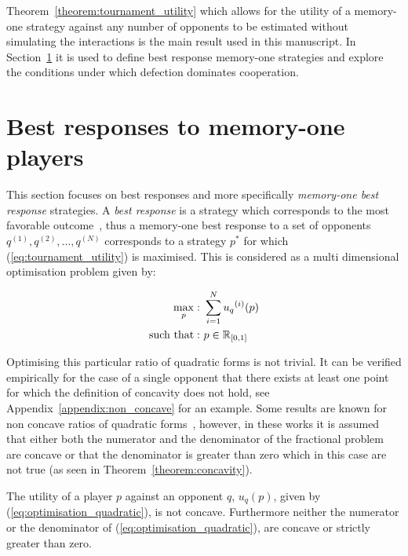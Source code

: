 Theorem~\ref{theorem:tournament_utility} which allows for the utility of a
memory-one strategy against any number of opponents to be estimated without
simulating the interactions is the main result used in this manuscript. In
Section~\ref{section:best_response_mem_one} it is used to  define best response
memory-one strategies and explore the conditions under which defection dominates
cooperation.

\section{Best responses to memory-one players}\label{section:best_response_mem_one}

This section focuses on best responses and more specifically \textit{memory-one
best response} strategies. A \textit{best response} is a strategy which
corresponds to the most favorable outcome~\cite{Tadelis2013}, thus a memory-one
best response to a set of opponents \(q^{(1)}, q^{(2)}, \dots, q^{(N)}\) corresponds to a strategy \(p^*\) for which
(\ref{eq:tournament_utility}) is maximised. This is considered as a multi
dimensional optimisation problem given by:

\begin{equation}\label{eq:mo_tournament_optimisation}
    \begin{aligned}
    \max_p: & \ \sum_{i=1} ^ {N} {u_q}^{(i)} (p)
    \\
    \text{such that}: & \ p \in \mathbb{R}_{[0, 1]}
    \end{aligned}
\end{equation}

Optimising this particular ratio of quadratic forms is not trivial. It can be
verified empirically for the case of a single opponent that there exists at least
one point for which the definition of concavity does not hold, see Appendix~\ref{appendix:non_concave}
for an example. Some results are
known for non concave ratios of quadratic forms~\cite{Beck2009, Hongyan2014},
however, in these works it is assumed that either both the numerator and the
denominator of the fractional problem are concave or that the denominator is
greater than zero which in this case are not true
(as seen in Theorem~\ref{theorem:concavity}).

\begin{theorem}\label{theorem:concavity}
    The utility of a player \(p\) against an opponent \(q\), \(u_q (p)\), given
    by (\ref{eq:optimisation_quadratic}), is not concave. Furthermore neither
    the numerator or the denominator of (\ref{eq:optimisation_quadratic}), are
    concave or strictly greater than zero.
\end{theorem}

